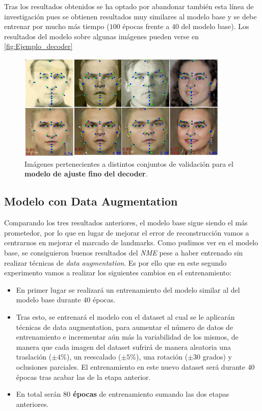         \medskip

        \noindent Tras los resultados obtenidos se ha optado por abandonar también esta línea de investigación pues se obtienen resultados muy similares al modelo base y se debe entrenar por mucho más tiempo ($100$ épocas frente a $40$ del modelo base). Los resultados del modelo sobre algunas imágenes pueden verse en \autoref{fig:Ejemplo_decoder}

        \begin{figure}[!h]
            \centering
            \includegraphics[width=0.9\textwidth]{img/image_decoder.png}
            \caption{Imágenes pertenecientes a distintos conjuntos de validación para el \textbf{modelo de ajuste fino del decoder}.}
            \label{fig:Ejemplo_decoder}
        \end{figure}

    \subsection{Modelo con Data Augmentation}
        \noindent Comparando los tres resultados anteriores, el modelo base sigue siendo el más prometedor, por lo que en lugar de mejorar el error de reconstrucción vamos a centrarnos en mejorar el marcado de landmarks. Como pudimos ver en el modelo base, se consiguieron buenos resultados del \textit{NME} pese a haber entrenado sin realizar técnicas de \textit{data augmentation}. Es por ello que en este segundo experimento vamos a realizar los siguientes cambios en el entrenamiento: 
        
        \begin{itemize}
            \item En primer lugar se realizará un entrenamiento del modelo similar al del modelo base durante $40$ épocas.
            \item Tras esto, se entrenará el modelo con el dataset al cual se le aplicarán técnicas de data augmentation, para aumentar el número de datos de entrenamiento e incrementar aún más la variabilidad de los mismos, de manera que cada imagen del dataset sufrirá de manera aleatoria una traslación ($\pm 4\%$), un reescalado ($\pm 5\%$), una rotación ($\pm 30$ grados) y oclusiones parciales. El entrenamiento en este nuevo dataset será durante $40$ épocas tras acabar las de la etapa anterior. 
            \item En total serán \textbf{$80$ épocas} de entrenamiento sumando las dos etapas anteriores.
        \end{itemize}

